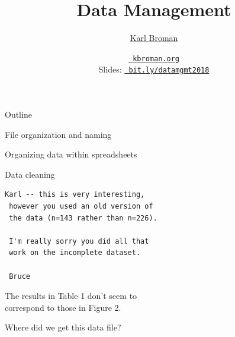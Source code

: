 \documentclass[aspectratio=169,12pt,t]{beamer}
\title{Data Management}
\author{\href{https://kbroman.org}{Karl Broman}}
\institute{Biostatistics \& Medical Informatics \\ Univ.\ Wisconsin{\textendash}Madison}
\date{\href{https://kbroman.org}{\tt \scriptsize \color{foreground} kbroman.org}
\\[2pt]
\scriptsize {\lolit Slides:} \href{https://bit.ly/datamgmt2018}{\tt \scriptsize
  \color{foreground} bit.ly/datamgmt2018}
}
\begin{document}
{
 }


\begin{frame}[c]{Outline}

  \bbi
\item File organization and naming
\item Organizing data within spreadsheets
\item Data cleaning
  \ei

\end{frame}



\begin{frame}[fragile,c]{}

\begin{center}
\begin{minipage}[c]{9.3cm}
\begin{semiverbatim}
\lstset{basicstyle=\normalsize}
\begin{lstlisting}[linewidth=9.3cm]
 Karl -- this is very interesting,
 however you used an old version of
 the data (n=143 rather than n=226).

 I'm really sorry you did all that
 work on the incomplete dataset.

 Bruce
\end{lstlisting}
\end{semiverbatim}
\end{minipage}
\end{center}

\end{frame}


\begin{frame}[c]{}
\centering
{\Large The results in Table 1 don't seem to \\[12pt]
correspond to those in Figure 2.}

\end{frame}



\begin{frame}[c]{}
\centerline{\Large Where did we get this data file?}
\end{frame}
\end{document}
